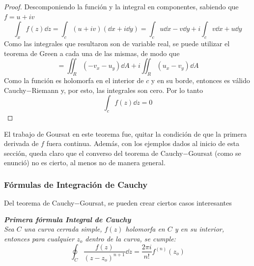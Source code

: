 \begin{proof}
	Descomponiendo la función y la integral en componentes, sabiendo que $f = u + iv$
		$$\int _x f(z) \dd{z} = \int _c (u+iv)(\dd{x} + i\dd{y}) = \int _c u\dd{x} - v\dd{y} + i\int _c v\dd{x} + u\dd{y}$$
	Como las integrales que resultaron son de variable real, se puede utilizar el teorema de Green a cada una de las mismas, de modo que
		$$ = \iint _R (-v_x - u_y) \dd{A} + i\iint _R (u_x - v_y) \dd{A}$$
	Como la función es holomorfa en el interior de $c$ y en su borde, entonces es válido Cauchy$-$Riemann y, por esto, las integrales son cero. Por lo tanto
		$$\int _c f(z) \dd{z} = 0$$
\end{proof}


El trabajo de Goursat en este teorema fue, quitar la condición de que la primera derivada de $f$ fuera continua. Además, con los ejemplos dados al inicio de esta sección, queda claro que el converso del teorema de Cauchy$-$Goursat (como se enunció) no es cierto, al menos no de manera general.



\subsubsection{Fórmulas de Integración de Cauchy}

Del teorema de Cauchy$-$Goursat, se pueden crear ciertos casos interesantes

\begin{teorema} \it
	\textbf{Primera fórmula Integral de Cauchy} \\
	Sea $C$ una curva cerrada simple, $f(z)$ holomorfa en $C$ y en su interior, entonces para cualquier $z_o$ dentro de la curva, se cumple:
	$$\oint _C \frac{f(z)}{(z - z_o)^{n+1}} \dd{z} = \frac{2\pi i}{n!}f^{(n)} (z_o)$$
\end{teorema}
